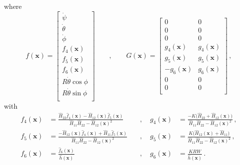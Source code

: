 \documentclass[a4paper]{article}
\renewcommand{\vec}[1]{\mathbf{#1}} %
\newcommand{\vx}{\vec{x}}
\newcommand{\hH}{\widehat{H}}
\newcommand{\hh}{\widehat{h}}
\newcommand{\hf}{\widehat{f}}
\newcommand{\pitch}{\psi}
\newcommand{\yaw}{\phi}
\newcommand{\roll}{\theta}
\begin{document}
where
\begin{equation}
    f(\vx) = \left[ \begin{array}{c}
                    \dot\pitch \\
                    \dot\roll \\
                    \dot\yaw \\
                    f_4(\vx) \\
                    f_5(\vx) \\
                    f_6(\vx) \\
                    R \dot\roll \cos\yaw \\
                    R \dot\roll \sin\yaw \\
                    \end{array} \right]
    \qquad , \qquad
    G(\vx) = \left[ \begin{array}{cc}
                    0 & 0 \\
                    0 & 0 \\
                    0 & 0 \\
                    g_4(\vx) & g_4(\vx) \\
                    g_5(\vx) & g_5(\vx) \\
                    -g_6(\vx) & g_6(\vx) \\
                    0 & 0 \\
                    0 & 0 \\
                    \end{array} \right]
    \,,
\end{equation}
with
\begin{equation} \begin{aligned}
    f_4(\vx) &= \frac{\hH_{22}\hf_4(\vx) - \hH_{12}(\vx)\hf_5(\vx)}
                     {\hH_{11}\hH_{22} - \hH_{12}(\vx)^2}
    \quad &, \quad
    g_4(\vx) &= \frac{-K\big(\hH_{22} + \hH_{12}(\vx)\big)}
                     {\hH_{11}\hH_{22} - \hH_{12}(\vx)^2}
    \,, \\
    f_5(\vx) &= \frac{-\hH_{12}(\vx)\hf_4(\vx) + \hH_{11}\hf_5(\vx)}
                     {\hH_{11}\hH_{22} - \hH_{12}(\vx)^2}
    \quad &, \quad
    g_5(\vx) &= \frac{K\big(\hH_{12}(\vx) + \hH_{11}\big)}
                     {\hH_{11}\hH_{22} - \hH_{12}(\vx)^2}
    \,, \\
    f_6(\vx) &= \frac{\hf_6(\vx)}
                     {\hh(\vx)}
    \quad &, \quad
    g_6(\vx) &= \frac{K R W}{\hh(\vx)}
    \,.
\end{aligned} \end{equation}
\end{document}
